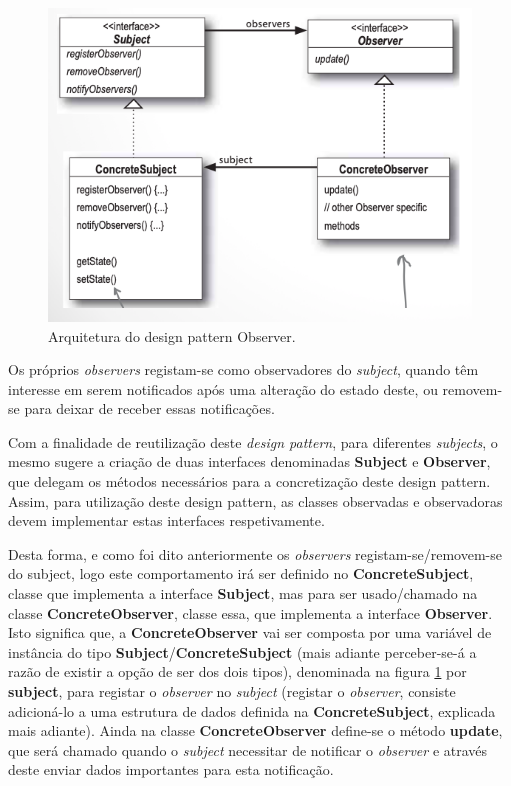 \begin{figure}[H]
    \centering
    \includegraphics[scale=0.55]{images/observer-2.png}
    \caption{Arquitetura do design pattern Observer.}
    \label{fig:diagrama-classes-observer}
\end{figure}


\hspace{2mm} Os próprios \textit{observers} registam-se como observadores do \textit{subject}, quando têm interesse em serem notificados após uma alteração do estado deste, ou removem-se para deixar de receber essas notificações. 

\hspace{2mm} Com a finalidade de reutilização deste \textit{design pattern}, para diferentes \textit{subjects}, o mesmo sugere a criação de duas interfaces denominadas \textbf{Subject} e \textbf{Observer}, que delegam os métodos necessários para a concretização deste design pattern. Assim, para utilização deste design pattern, as classes observadas e observadoras devem implementar estas interfaces respetivamente. 

\hspace{2mm} Desta forma, e como foi dito anteriormente os \textit{observers} registam-se/removem-se do subject, logo este comportamento irá ser definido no \textbf{ConcreteSubject}, classe que implementa a interface \textbf{Subject}, mas para ser usado/chamado na classe \textbf{ConcreteObserver}, classe essa, que implementa a interface \textbf{Observer}. Isto significa que, a \textbf{ConcreteObserver} vai ser composta por uma variável de instância do tipo \textbf{Subject}/\textbf{ConcreteSubject} (mais adiante perceber-se-á a razão de existir a opção de ser dos dois tipos), denominada na figura \ref{fig:diagrama-classes-observer} por \textbf{subject}, para registar o \textit{observer} no \textit{subject} (registar o \textit{observer}, consiste adicioná-lo a uma estrutura de dados definida na \textbf{ConcreteSubject}, explicada mais adiante). Ainda na classe \textbf{ConcreteObserver} define-se o método \textbf{update}, que será chamado quando o \textit{subject} necessitar de notificar o \textit{observer} e através deste enviar dados importantes para esta notificação.

